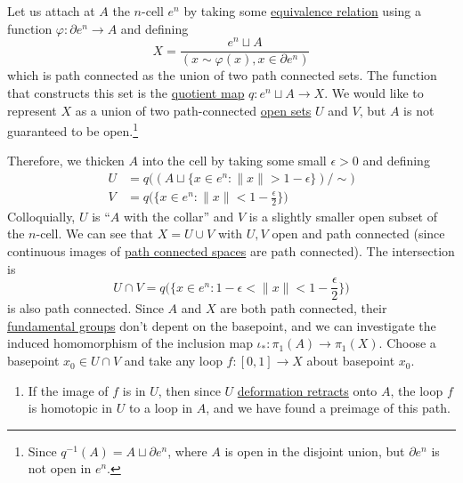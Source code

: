 	\begin{solution}
		Let us attach at $A$ the $n$-cell $e^n$ by taking some \hyperref[st-def:equivalence_relation]{equivalence relation} using a function $\varphi: \partial e^n \to A$ and defining 
		\begin{equation}
			X = \frac{e^n \sqcup A}{(x \sim \varphi(x), x \in \partial e^n)}
		\end{equation} 
		which is path connected as the union of two path connected sets. The function that constructs this set is the \hyperref[pst-def:quotient-map]{quotient map} $q: e^n \sqcup A \to X$. We would like to represent $X$ as a union of two path-connected \hyperref[pst-def:open-set]{open sets} $U$ and $V$, but $A$ is not guaranteed to be open.\footnote{Since $q^{-1}(A) = A \sqcup \partial e^n$, where $A$ is open in the disjoint union, but $\partial e^n$ is not open in $e^n$. } 

		Therefore, we thicken $A$ into the cell by taking some small $\epsilon > 0$ and defining 
		\begin{align}
			U & = q \big( (A \sqcup \{x \in e^n \colon \|x\| > 1 - \epsilon \})/\sim \big) \\ 
			V & = q \big(\{ x \in e^n \colon \|x\| < 1 - \frac{\epsilon}{2} \})
		\end{align} 
		Colloquially, $U$ is ``$A$ with the collar'' and $V$ is a slightly smaller open subset of the $n$-cell. We can see that $X = U \cup V$ with $U, V$ open and path connected (since continuous images of \hyperref[pst-def:path-connected-space]{path connected spaces} are path connected). The intersection is 
		\begin{equation}
			U \cap V = q\big( \{x \in e^n \colon 1 - \epsilon < \|x\| < 1 - \frac{\epsilon}{2} \} \big) 
		\end{equation}
		is also path connected. Since $A$ and $X$ are both path connected, their \hyperref[def:fundamental-group]{fundamental groups} don't depent on the basepoint, and we can investigate the induced homomorphism of the inclusion map $\iota_\ast : \pi_1 (A) \to \pi_1 (X)$. Choose a basepoint $x_0 \in U \cap V$ and take any loop $f: [0, 1] \to X$ about basepoint $x_0$. 
		\begin{enumerate}
		  \item If the image of $f$ is in $U$, then since $U$ \hyperref[def:deformation-retract]{deformation retracts} onto $A$, the loop $f$ is homotopic in $U$ to a loop in $A$, and we have found a preimage of this path. 


\end{enumerate}
\end{solution}

